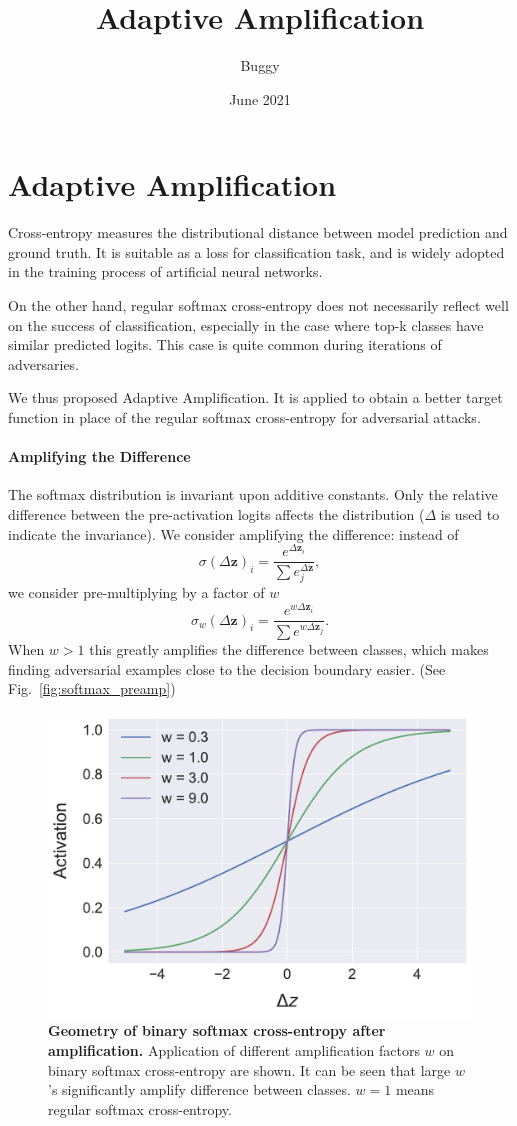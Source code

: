 \documentclass{paper}
\title{Adaptive Amplification}
\author{Buggy}
\date{June 2021}
\begin{document}
\maketitle

\section{Adaptive Amplification}
Cross-entropy measures the distributional distance between model prediction and ground truth. It is suitable as a loss for classification task, and is widely adopted in the training process of artificial neural networks.

On the other hand, regular softmax cross-entropy does not necessarily reflect well on the success of classification, especially in the case where top-k classes have similar predicted logits. This case is quite common during iterations of adversaries.

We thus proposed Adaptive Amplification. It is applied to obtain a better target function in place of the regular softmax cross-entropy for adversarial attacks.

\paragraph{Amplifying the Difference} The softmax distribution is invariant upon additive constants. Only the relative difference between the pre-activation logits affects the distribution ($\Delta$ is used to indicate the invariance). We consider amplifying the difference: instead of
\newcommand{\vdz}{\Delta \mathbf{z}}
\begin{equation}
    \sigma(\vdz)_i = \frac{e^{\vdz_i}}{\sum e^{\vdz}_j},
\end{equation}
we consider pre-multiplying by a factor of $w$
\begin{equation}
    \sigma_w(\vdz)_i = \frac{e^{w\vdz_i}}{\sum e^{w\vdz_j}}.
\end{equation}
When $w > 1$ this greatly amplifies the difference between classes, which makes finding adversarial examples close to the decision boundary easier. (See Fig.\ \ref{fig:softmax_preamp})

\begin{figure}[ht]
    \label{fig:softmax_preamp}
    \centering
    \includegraphics[width=0.5\linewidth]{bin_amp_geo.pdf}
    \caption{\textbf{Geometry of binary softmax cross-entropy after amplification.} Application of different amplification factors $w$ on binary softmax cross-entropy are shown. It can be seen that large $w$'s significantly amplify difference between classes. $w = 1$ means regular softmax cross-entropy.}
    \label{fig:my_label}
\end{figure}
\end{document}
